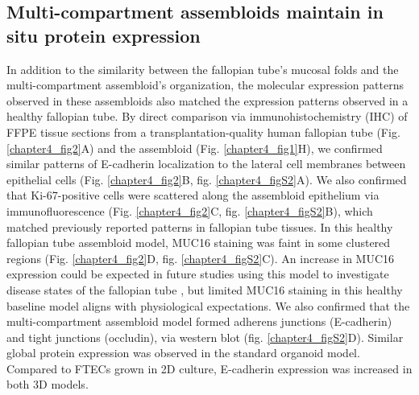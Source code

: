 \begin{refsection}
    \subsection{Multi-compartment assembloids maintain in situ protein expression}
    In addition to the similarity between the fallopian tube’s mucosal folds and the multi-compartment assembloid’s organization, the molecular expression patterns observed in these assembloids also matched the expression patterns observed in a healthy fallopian tube. By direct comparison via immunohistochemistry (IHC) of FFPE tissue sections from a transplantation-quality human fallopian tube (Fig. \ref{chapter4_fig2}A) and the assembloid (Fig. \ref{chapter4_fig1}H), we confirmed similar patterns of E-cadherin localization to the lateral cell membranes between epithelial cells (Fig. \ref{chapter4_fig2}B, fig. \ref{chapter4_figS2}A). We also confirmed that Ki-67-positive cells were scattered along the assembloid epithelium via immunofluorescence (Fig. \ref{chapter4_fig2}C, fig. \ref{chapter4_figS2}B), which matched previously reported patterns in fallopian tube tissues\cite{kessler2015a}. In this healthy fallopian tube assembloid model, MUC16 staining was faint in some clustered regions (Fig. \ref{chapter4_fig2}D, fig. \ref{chapter4_figS2}C). An increase in MUC16 expression could be expected in future studies using this model to investigate disease states of the fallopian tube \cite{bast2009a,aithal2018a}, but limited MUC16 staining in this healthy baseline model aligns with physiological expectations. 
    We also confirmed that the multi-compartment assembloid model formed adherens junctions (E-cadherin)\cite{stockinger2001a,soler1999a,bajpai2008a} and tight junctions (occludin)\cite{cummins2012a}, via western blot (fig. \ref{chapter4_figS2}D). Similar global protein expression was observed in the standard organoid model. Compared to FTECs grown in 2D culture, E-cadherin expression was increased in both 3D models. 

\end{refsection}
